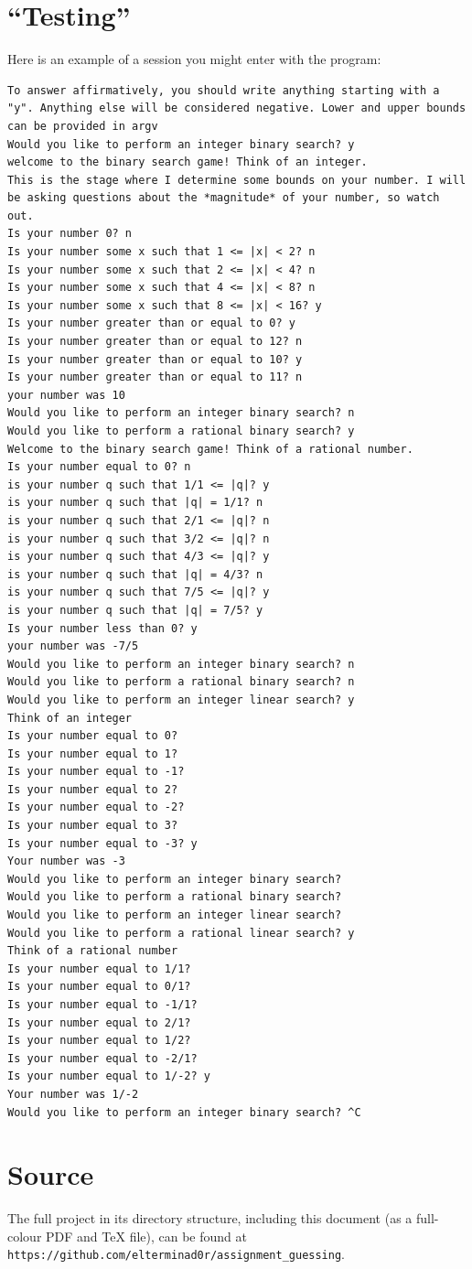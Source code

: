 \documentclass{article}
\begin{document}
    \section{``Testing''}

    Here is an example of a session you might enter with the program:

\begin{lstlisting}[caption=Typical session]
To answer affirmatively, you should write anything starting with a "y". Anything else will be considered negative. Lower and upper bounds can be provided in argv
Would you like to perform an integer binary search? y
welcome to the binary search game! Think of an integer.
This is the stage where I determine some bounds on your number. I will be asking questions about the *magnitude* of your number, so watch out.
Is your number 0? n
Is your number some x such that 1 <= |x| < 2? n
Is your number some x such that 2 <= |x| < 4? n
Is your number some x such that 4 <= |x| < 8? n
Is your number some x such that 8 <= |x| < 16? y
Is your number greater than or equal to 0? y
Is your number greater than or equal to 12? n
Is your number greater than or equal to 10? y
Is your number greater than or equal to 11? n
your number was 10
Would you like to perform an integer binary search? n
Would you like to perform a rational binary search? y
Welcome to the binary search game! Think of a rational number.
Is your number equal to 0? n
is your number q such that 1/1 <= |q|? y
is your number q such that |q| = 1/1? n
is your number q such that 2/1 <= |q|? n
is your number q such that 3/2 <= |q|? n
is your number q such that 4/3 <= |q|? y
is your number q such that |q| = 4/3? n
is your number q such that 7/5 <= |q|? y
is your number q such that |q| = 7/5? y
Is your number less than 0? y
your number was -7/5
Would you like to perform an integer binary search? n
Would you like to perform a rational binary search? n
Would you like to perform an integer linear search? y
Think of an integer
Is your number equal to 0? 
Is your number equal to 1? 
Is your number equal to -1? 
Is your number equal to 2? 
Is your number equal to -2? 
Is your number equal to 3? 
Is your number equal to -3? y
Your number was -3
Would you like to perform an integer binary search? 
Would you like to perform a rational binary search? 
Would you like to perform an integer linear search? 
Would you like to perform a rational linear search? y
Think of a rational number
Is your number equal to 1/1? 
Is your number equal to 0/1? 
Is your number equal to -1/1? 
Is your number equal to 2/1? 
Is your number equal to 1/2? 
Is your number equal to -2/1? 
Is your number equal to 1/-2? y
Your number was 1/-2
Would you like to perform an integer binary search? ^C
\end{lstlisting}

    \section{Source}
    The full project in its directory structure, including this document (as a
    full-colour PDF and \TeX{} file), can be found at\\
    \verb|https://github.com/elterminad0r/assignment_guessing|.
\end{document}
